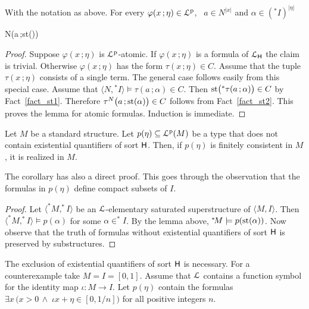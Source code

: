 \documentclass[10pt,oneside]{amsproc}
\begin{document}

\begin{lemma}\label{lem_st}
  With the notation as above.
  For every $\varphi(x\,;\eta)\in{\EuScript L}^{\rm p}$, \  $a\in N^{|x|}$ and $\alpha\in({}^*\!\!I)^{|\eta|}$ 
  
  {\Rightarrow}
  {N\models\varphi\big(a\,;{\rm st}(\alpha)\big)}
\end{lemma}

\begin{proof}
  Suppose $\varphi(x\,;\eta)$ is ${\EuScript L}^{\rm p}$-atomic.
  If $\varphi(x\,;\eta)$ is a formula of ${\EuScript L}_{\sf H}$ the claim is trivial. 
  Otherwise $\varphi(x\,;\eta)$ has the form $\tau(x\,;\eta)\in C$.
  Assume that the tuple $\tau(x\,;\eta)$ consists of a single term.
  The general case follows easily from this special case. 
  Assume that $\langle N,{}^*\!\!I\rangle\models \tau(a\,;\alpha)\in C$.
  Then ${\rm st}\big({}^*\tau(a\,;\alpha)\big)\in C$ by Fact~\ref{fact_st1}.
  Therefore $\tau^N\big(a\,;{\rm st}(\alpha)\big)\in C$ follows from Fact~\ref{fact_st2}.
  This proves the lemma for atomic formulas.
  Induction is immediate. 
\end{proof}

\begin{corollary}\label{corol_st}
  Let $M$ be a standard structure.
  Let $p(\eta)\subseteq{\EuScript L}^{\rm p}(M)$ be a type that does not contain existential quantifiers of sort ${\sf H}$.
  Then, if $p(\eta)$ is finitely consistent in $M$, it is realized in $M$.
 \end{corollary}
 
 The corollary has also a direct proof.
 This goes through the observation that the formulas in $p(\eta)$ define compact subsets of $I$.

 \begin{proof}
  Let $\langle ^*\!M,^*\!\!I\rangle$ be an ${\EuScript L}$-elementary saturated superstructure of $\langle M,I\rangle$.
  Then $\langle ^*\!M,^*\!\!I\rangle\models p(\alpha)$ for some $\alpha\in ^*\!\!I$.
  By the lemma above, $^*\!M\models p({\rm st}(\alpha))$.
  Now observe that the truth of formulas without  existential quantifiers of sort ${\sf H}$ is preserved by substructures.
 \end{proof}
 
 The exclusion of existential quantifiers of sort ${\sf H}$ is necessary.
 For a counterexample take $M=I=[0,1]$.
 Assume that ${\EuScript L}$ contains a function symbol for the identity map $\iota:M\to I$.
 Let $p(\eta)$ contain the formulas $\exists x\,\big(x>0\,\wedge\;\iota x+\eta\in[0,1/n]\big)$ for all positive integers $n$.
\end{document}
